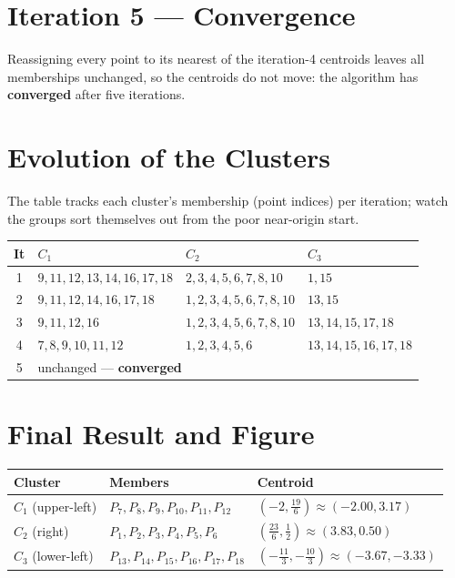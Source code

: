 \documentclass[11pt,a4paper]{report}
\theoremstyle{definition}
\theoremstyle{plain}
\theoremstyle{remark}
\begin{document}
	\section{Iteration 5 --- Convergence}
	Reassigning every point to its nearest of the iteration-4 centroids leaves all
	memberships unchanged, so the centroids do not move: the algorithm has
	\textbf{converged} after five iterations.
	
	\section{Evolution of the Clusters}
	The table tracks each cluster's membership (point indices) per iteration; watch
	the groups sort themselves out from the poor near-origin start.
	\begin{center}
	\small
	\begin{tabular}{@{}clll@{}}
	\toprule
	It & $C_1$ & $C_2$ & $C_3$\\
	\midrule
	1 & $9,11,12,13,14,16,17,18$ & $2,3,4,5,6,7,8,10$ & $1,15$\\
	2 & $9,11,12,14,16,17,18$ & $1,2,3,4,5,6,7,8,10$ & $13,15$\\
	3 & $9,11,12,16$ & $1,2,3,4,5,6,7,8,10$ & $13,14,15,17,18$\\
	4 & $7,8,9,10,11,12$ & $1,2,3,4,5,6$ & $13,14,15,16,17,18$\\
	5 & \multicolumn{3}{l}{unchanged --- \textbf{converged}}\\
	\bottomrule
	\end{tabular}
	\end{center}
	
	\section{Final Result and Figure}
	\begin{center}
	\begin{tabular}{@{}lll@{}}
	\toprule
	Cluster & Members & Centroid\\
	\midrule
	$C_1$ (upper-left) & $P_7,P_8,P_9,P_{10},P_{11},P_{12}$ & $(-2,\tfrac{19}{6})\approx(-2.00,3.17)$\\
	$C_2$ (right)      & $P_1,P_2,P_3,P_4,P_5,P_6$          & $(\tfrac{23}{6},\tfrac12)\approx(3.83,0.50)$\\
	$C_3$ (lower-left) & $P_{13},P_{14},P_{15},P_{16},P_{17},P_{18}$ & $(-\tfrac{11}{3},-\tfrac{10}{3})\approx(-3.67,-3.33)$\\
	\bottomrule
	\end{tabular}
	\end{center}
	
\end{document}
